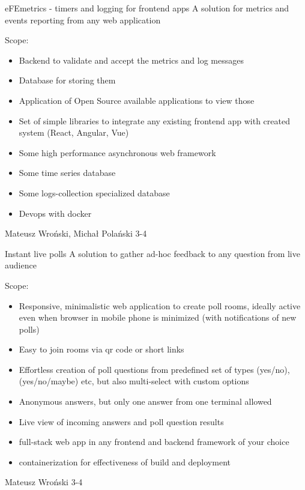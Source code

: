 \begin{project}
{eFEmetrics - timers and logging for frontend apps}
{A solution for metrics and events reporting from any web application} 
{
Scope:
\begin{itemize}
	\item Backend to validate and accept the metrics and log messages
	\item Database for storing them
	\item Application of Open Source available applications to view those
	\item Set of simple libraries to integrate any existing frontend app with created system (React, Angular, Vue)
\end{itemize}
}
{
\begin{itemize}
	\item Some high performance asynchronous web framework
	\item Some time series database
	\item Some logs-collection specialized database
	\item Devops with docker
\end{itemize}
}
{Mateusz Wroński, Michał Polański}
{3-4}
\end{project}
\begin{project}
{Instant live polls}
{A solution to gather ad-hoc feedback to any question from live audience} 
{
Scope:
\begin{itemize}
	\item Responsive, minimalistic web application to create poll rooms, ideally active even when browser in mobile phone is minimized (with notifications of new polls)
	\item Easy to join rooms via qr code or short links
	\item Effortless creation of poll questions from predefined set of types (yes/no), (yes/no/maybe) etc, but also multi-select with custom options
	\item Anonymous answers, but only one answer from one terminal allowed
	\item Live view of incoming answers and poll question results
\end{itemize}
}
{
\begin{itemize}
	\item full-stack web app in any frontend and backend framework of your choice
	\item containerization for effectiveness of build and deployment
\end{itemize}
}
{Mateusz Wroński}
{3-4}
\end{project}

